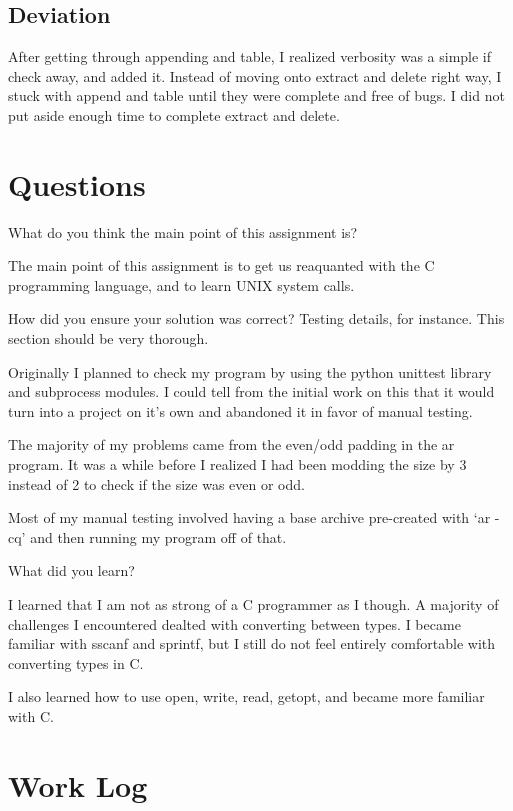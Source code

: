 \documentclass[letterpaper,10pt]{article}
\begin{document}
\subsection{Deviation}
    After getting through appending and table, I realized verbosity was
    a simple if check away, and added it. Instead of moving onto extract
    and delete right way, I stuck with append and table until they were
    complete and free of bugs. I did not put aside enough time to
    complete extract and delete.

\section{Questions}
\begin{description}
  \item  What do you think the main point of this assignment is?

         The main point of this assignment is to get us reaquanted with
         the C programming language, and to learn UNIX system calls.

  \item  How did you ensure your solution was correct? Testing details, for
         instance. This section should be very thorough.

         Originally I planned to check my program by using the python
         unittest library and subprocess modules. I could tell from the
         initial work on this that it would turn into a project on it's
         own and abandoned it in favor of manual testing.
         
         The majority of my problems came from the even/odd padding in
         the ar program. It was a while before I realized I had been
         modding the size by 3 instead of 2 to check if the size was
         even or odd.

         Most of my manual testing involved having a base archive
         pre-created with `ar -cq' and then running my program off of
         that.

  \item  What did you learn?
        
         I learned that I am not as strong of a C programmer as I
         though. A majority of challenges I encountered dealted with
         converting between types. I became familiar with sscanf and
         sprintf, but I still do not feel entirely comfortable with
         converting types in C.

         I also learned how to use open, write, read, getopt, and became
         more familiar with C.
\end{description}

\newpage

\section{Work Log}


\end{document}
